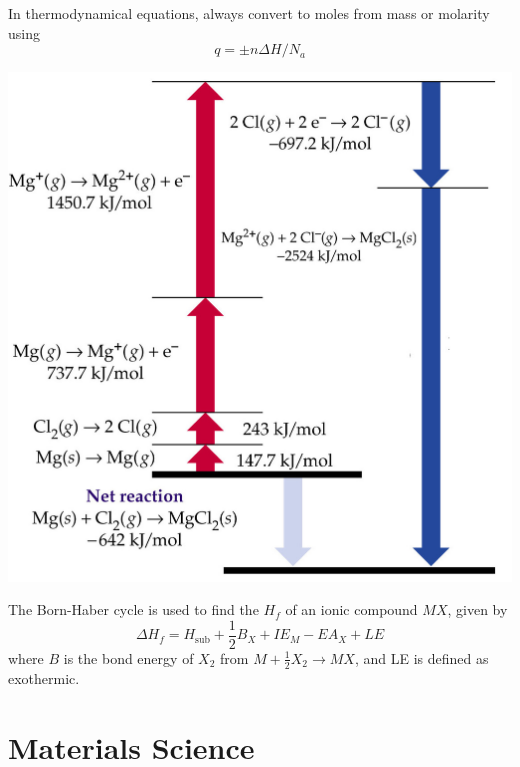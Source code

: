 \documentclass{tufte-book}
\begin{document}
In thermodynamical equations, always convert to moles from mass or molarity using \begin{equation}
  q = \pm n \Delta H / N_a
\end{equation}
%
\begin{marginfigure}[-50mm]
\begin{center}
  \includegraphics[width=\textwidth]{bornhaber}
\end{center}
\end{marginfigure}
%
The Born-Haber cycle is used to find the $H_f$ of an ionic compound $MX$, given by \begin{equation}
  \Delta H_f = H_{\text{sub}} + \textstyle{\frac{1}{2}} B_X + IE_M - EA_X + LE
\end{equation}
where $B$ is the bond energy of $X_2$ from $M + \frac{1}{2} X_2 \to MX$, and LE is defined as exothermic.


\chapter{Materials Science}
\end{document}
